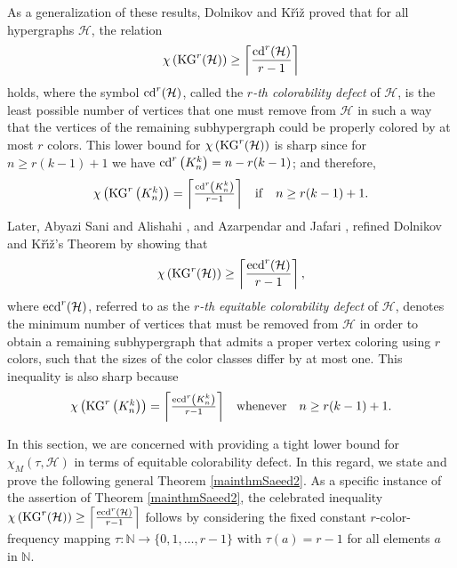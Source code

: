 \documentclass[11pt]{amsart}
\theoremstyle{definition}
\begin{document}
As a generalization of these results, Dol{\cprime}nikov and K{\v{r}}{\'{\i}}{\v{z}} \cite{MR953021,MR1081939,MR1665335}
proved that for all hypergraphs ${\mathcal H}$, the relation
$$\chi\left({\rm KG}^r   ({\mathcal H})  \right) \geq \left\lceil \frac{ {\rm cd}^r({\mathcal H}) }{r-1} \right\rceil $$
holds, where the symbol ${\rm cd}^r({\mathcal H})$, called the {\it $r$-th colorability defect} of ${\mathcal H}$, is the least possible number of vertices that one must remove from
${\mathcal H}$ in such a way that the vertices of the remaining subhypergraph could be properly colored by at most $r$ colors. This lower bound for
$\chi\left({\rm KG}^r   ({\mathcal H})  \right) $ is sharp since for
$n \geq r(k-1) + 1$ we have
${\rm cd}^r \left(  K_n^k \right) = n-r(k-1)$; and therefore,
$$\begin{array}{lrr}
	\chi\left({\rm KG}^r \left(  K_n^k \right) \right) = \left\lceil \frac{{\rm cd}^r \left(  K_n^k \right)}{r-1} \right\rceil &  {\rm if }  &  n \geq r(k-1) + 1 .
\end{array}$$
Later, Abyazi Sani and Alishahi \cite{ABYAZISANI2018229}, and Azarpendar and Jafari \cite{AZARPENDAR2023103664},
refined Dol{\cprime}nikov and K{\v{r}}{\'{\i}}{\v{z}}'s Theorem by showing that
$$\chi\left({\rm KG}^r ({\mathcal H}) \right) \geq \left\lceil \frac{ {\rm ecd}^r({\mathcal H}) }{r-1} \right\rceil ,$$
where ${\rm ecd}^r({\mathcal H})$, referred to as the {\it $r$-th equitable colorability defect} of ${\mathcal H}$, denotes the minimum number of vertices that must be
removed from ${\mathcal H}$ in order to obtain a remaining subhypergraph that admits a proper vertex coloring using $r$ colors, such that the sizes of the color classes differ by at most one.
This inequality is also sharp because
$$\begin{array}{lrr}
	\chi\left({\rm KG}^r \left(  K_n^k \right) \right) = \left\lceil \frac{{\rm ecd}^r \left(  K_n^k \right)}{r-1} \right\rceil &  {\rm whenever }  &  n \geq r(k-1) + 1 .
\end{array}$$

In this section, we are concerned with providing a tight lower bound for $\chi_M(\tau, {\mathcal H})$ in terms of equitable colorability defect.
In this regard, we state and prove the following general Theorem \ref{mainthmSaeed2}.
As a specific instance of the assertion of Theorem \ref{mainthmSaeed2}, the celebrated inequality
$\chi\left({\rm KG}^r ({\mathcal H}) \right) \geq \left\lceil \frac{ {\rm ecd}^r({\mathcal H}) }{r-1} \right\rceil $
follows by considering the fixed constant $r$-color-frequency mapping
$\tau: \mathbb{N} \longrightarrow \{0,1,\ldots,r-1\}$ with $\tau (a) = r-1$ for all elements $a$ in $ \mathbb{N} $.
\end{document}
